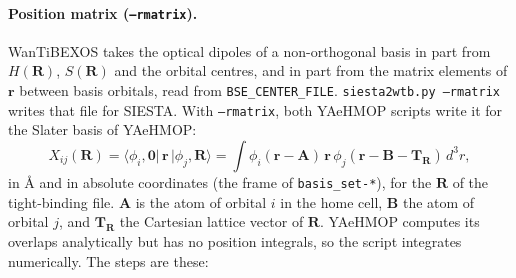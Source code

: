 \documentclass[11pt,a4paper]{article}
\newcommand{\file}[1]{\texttt{#1}}
\newcommand{\opt}[1]{\texttt{#1}}
\begin{document}
\paragraph{Position matrix (\opt{--rmatrix}).} WanTiBEXOS takes the optical dipoles of a
non-orthogonal basis in part from $H(\mathbf{R})$, $S(\mathbf{R})$ and the orbital centres, and
in part from the matrix elements of $\mathbf{r}$ between basis orbitals, read from
\texttt{BSE\_CENTER\_FILE}. \file{siesta2wtb.py --rmatrix} writes that file for SIESTA. With
\opt{--rmatrix}, both YAeHMOP scripts write it for the Slater basis of YAeHMOP:
\begin{equation}
X_{ij}(\mathbf{R}) = \langle \phi_i,\mathbf{0}|\,\mathbf{r}\,|\phi_j,\mathbf{R}\rangle
 = \int \phi_i(\mathbf{r}-\mathbf{A})\,\mathbf{r}\,\phi_j(\mathbf{r}-\mathbf{B}-\mathbf{T}_\mathbf{R})\,d^3r ,
\end{equation}
in \AA{} and in absolute coordinates (the frame of \file{basis\_set-*}), for the $\mathbf{R}$
of the tight-binding file. $\mathbf{A}$ is the atom of orbital $i$ in the home cell,
$\mathbf{B}$ the atom of orbital $j$, and $\mathbf{T}_\mathbf{R}$ the Cartesian lattice vector
of $\mathbf{R}$. YAeHMOP computes its overlaps analytically but has no position integrals, so
the script integrates numerically. The steps are these:
\end{document}
